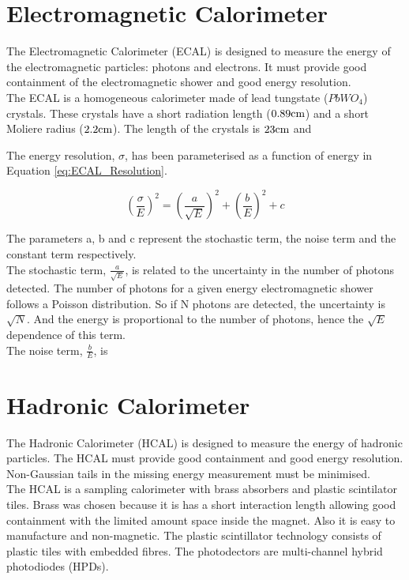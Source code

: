 \section{Electromagnetic Calorimeter}

The Electromagnetic Calorimeter (ECAL) is designed to measure the energy of the
electromagnetic particles: photons and electrons. It must provide good
containment of the electromagnetic shower and good energy resolution. \\

The ECAL is a homogeneous calorimeter made of lead tungstate ($PbWO_{4}$)
crystals. These crystals have a short radiation length ($0.89\mbox{cm}$) and a short 
Moliere radius ($2.2\mbox{cm}$). The length of the crystals is $23\mbox{cm}$ and  

The energy resolution, $\sigma$, has been parameterised as a function of energy 
in Equation \ref{eq:ECAL_Resolution}. 

\begin{equation}
\left( \frac{\sigma}{E} \right)^{2} = \left( \frac{a}{\sqrt{E}} \right)^{2} +
\left( \frac{b}{E} \right)^{2} + c
\label{eq:ECAL_Resolution}
\end{equation}

The parameters a, b and c represent the stochastic term, the noise term and the
constant term respectively. \\

The stochastic term, $\frac{a}{\sqrt{E}}$, is related to the uncertainty in the 
number of photons detected. The number of photons for a given energy 
electromagnetic shower follows a Poisson distribution. So if N photons are 
detected, the uncertainty is $\sqrt{N}$. And the energy is proportional to the 
number of photons, hence the $\sqrt{E}$ dependence of this term. \\

The noise term, $\frac{b}{E}$, is 

\section{Hadronic Calorimeter}

The Hadronic Calorimeter (HCAL) is designed to measure the energy of hadronic
particles. The HCAL must provide good containment and good energy resolution. 
Non-Gaussian tails in the missing energy measurement must be minimised. \\

The HCAL is a sampling calorimeter with brass absorbers and plastic scintilator
tiles. Brass was chosen because it is has a short interaction length allowing
good containment with the limited amount space inside the magnet. Also it is
easy to manufacture and non-magnetic. The plastic scintillator technology
consists of plastic tiles with embedded fibres. The photodectors are 
multi-channel hybrid photodiodes (HPDs). \\

